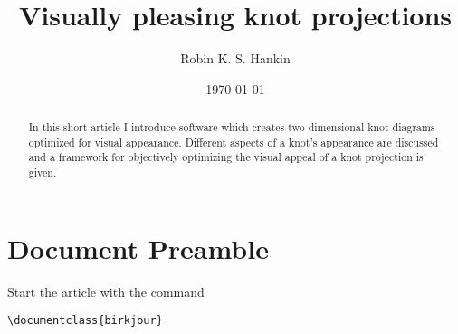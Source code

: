 \documentclass{birkjour}
\theoremstyle{definition}
\theoremstyle{remark}
\numberwithin{equation}{section}
\begin{document}
%
%
%
%
%
%
%
%
%


\title[Visually pleasing knot projections]{Visually pleasing knot projections}




\author[Hankin]{Robin K. S. Hankin}

\address{%
55 Wellesley Street East, Auckland 1010, New Zealand}




\date{\today}

\begin{abstract}
In this short article I introduce software which creates two
dimensional knot diagrams optimized for visual appearance.  Different
aspects of a knot's appearance are discussed and a framework for
objectively optimizing the visual appeal of a knot projection is
given.
\end{abstract}

\maketitle
\section{Document Preamble}
Start the article with the command

\begin{verbatim}\documentclass{birkjour}\end{verbatim}
\end{document}
